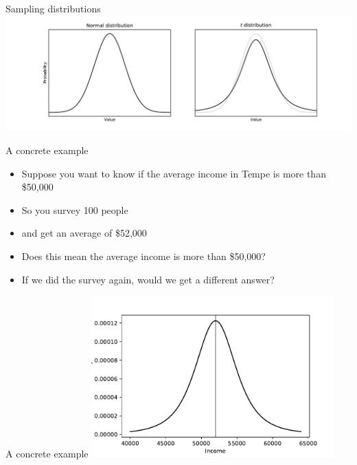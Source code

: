 \begin{frame}{Sampling distributions}
  \includegraphics[width=\textwidth]{fig/distributions.pdf}
\end{frame}

\begin{frame}{A concrete example}
  \begin{itemize}
    \item Suppose you want to know if the average income in Tempe is more than \$50,000
    \item So you survey 100 people
    \item and get an average of \$52,000
    \item Does this mean the average income is more than \$50,000?
    \item If we did the survey again, would we get a different answer?
  \end{itemize}
\end{frame}

\begin{frame}{A concrete example}
  \centering\includegraphics[width=0.7\textwidth]{fig/incdistribution.pdf}
\end{frame}

